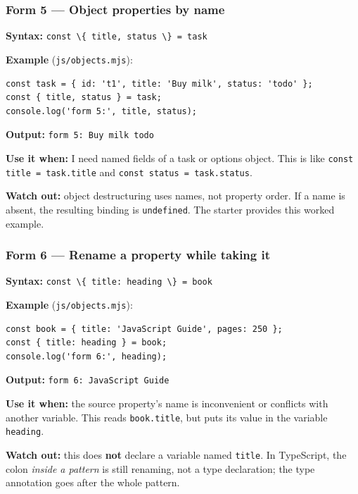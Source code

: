 \documentclass[
  9pt,
]{article}
\newcommand{\passthrough}[1]{#1}
\begin{document}
\subsubsection{Form 5 --- Object properties by
name}\label{form-5-object-properties-by-name}

\textbf{Syntax:}
\passthrough{\lstinline!const \{ title, status \} = task!}

\textbf{Example} (\passthrough{\lstinline!js/objects.mjs!}):

\begin{lstlisting}
const task = { id: 't1', title: 'Buy milk', status: 'todo' };
const { title, status } = task;
console.log('form 5:', title, status);
\end{lstlisting}

\textbf{Output:} \passthrough{\lstinline!form 5: Buy milk todo!}

\textbf{Use it when:} I need named fields of a task or options object.
This is like \passthrough{\lstinline!const title = task.title!} and
\passthrough{\lstinline!const status = task.status!}.

\textbf{Watch out:} object destructuring uses names, not property order.
If a name is absent, the resulting binding is
\passthrough{\lstinline!undefined!}. The starter provides this worked
example.

\subsubsection{Form 6 --- Rename a property while taking
it}\label{form-6-rename-a-property-while-taking-it}

\textbf{Syntax:}
\passthrough{\lstinline!const \{ title: heading \} = book!}

\textbf{Example} (\passthrough{\lstinline!js/objects.mjs!}):

\begin{lstlisting}
const book = { title: 'JavaScript Guide', pages: 250 };
const { title: heading } = book;
console.log('form 6:', heading);
\end{lstlisting}

\textbf{Output:} \passthrough{\lstinline!form 6: JavaScript Guide!}

\textbf{Use it when:} the source property's name is inconvenient or
conflicts with another variable. This reads
\passthrough{\lstinline!book.title!}, but puts its value in the variable
\passthrough{\lstinline!heading!}.

\textbf{Watch out:} this does \textbf{not} declare a variable named
\passthrough{\lstinline!title!}. In TypeScript, the colon \emph{inside a
pattern} is still renaming, not a type declaration; the type annotation
goes after the whole pattern.
\end{document}
